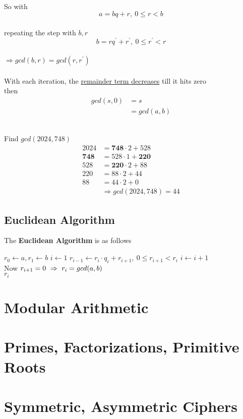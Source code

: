 \\
So with
$$a=bq+r, \ 0 \leq r < b$$ \\
repeating the step with $b,r$ \\
$$b=rq^\prime+r^\prime, \ 0 \leq r^\prime < r$$ \\
$\Rightarrow gcd(b,r) = gcd(r, r^\prime)$ \\
\\
With each iteration, the \underline{remainder term decreases} till it hits zero \\
then\\
\begin{align*}
  gcd(s,0) & = s        \\
           & = gcd(a,b)
\end{align*}\\
\begin{example}
  Find $gcd(2024,748)$
  \begin{align*}
    2024         & = \mathbf{748} \cdot 2 + 528 \\
    \mathbf{748} & = 528 \cdot 1 + \mathbf{220} \\
    528          & = \mathbf{220} \cdot 2 + 88  \\
    220          & = 88 \cdot 2 + 44            \\
    88           & = 44 \cdot 2 + 0             \\
                 & \Rightarrow gcd(2024,748)=44
  \end{align*}
\end{example}
\subsection{Euclidean Algorithm}
\begin{definition}
  The \textbf{Euclidean Algorithm} is as follows
  \begin{algorithmic}
    \State $r_0 \gets a, r_1 \gets b$
    \State $i \gets 1$
    \State $r_{i-1} \gets r_i \cdot q_i + r_{i+1}, \ 0 \leq r_{i+1} < r_i$
    \State $i \gets i + 1$
    \EndWhile \\
    Now $r_{i+1}=0 \ \Rightarrow \  r_i=gcd(a,b) \ $ \\
    \Return $r_i$
  \end{algorithmic}
\end{definition}
\section{Modular Arithmetic}
\section{Primes, Factorizations, Primitive Roots}
\section{Symmetric, Asymmetric Ciphers}